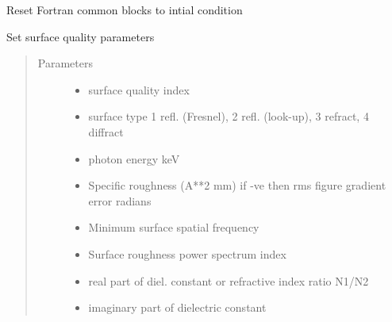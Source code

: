 \documentclass[letterpaper,10pt,english]{sphinxmanual}
\begin{document}
\begin{fulllineitems}
\label{\detokenize{xsrt_functions:xsrt.srtreset}}
Reset Fortran common blocks to intial condition

\end{fulllineitems}


\begin{fulllineitems}
\label{\detokenize{xsrt_functions:xsrt.surface}}
Set surface quality parameters
\begin{quote}\begin{description}
\item[{Parameters}] \leavevmode\begin{itemize}
\item {} 
 \textendash{} surface quality index

\item {} 
 \textendash{} surface type
1 refl. (Fresnel), 2 refl. (look-up), 3 refract, 4 diffract

\item {} 
 \textendash{} photon energy keV

\item {} 
 \textendash{} Specific roughness (A**2 mm)
if -ve then rms figure gradient error radians

\item {} 
 \textendash{} Minimum surface spatial frequency

\item {} 
 \textendash{} Surface roughness power spectrum index

\item {} 
 \textendash{} real part of diel. constant or refractive index ratio N1/N2

\item {} 
 \textendash{} imaginary part of dielectric constant


\end{itemize}
\end{description}
\end{quote}
\end{fulllineitems}
\end{document}
